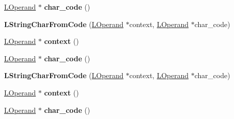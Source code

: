 \begin{DoxyCompactItemize}
\item 
\hyperlink{classv8_1_1internal_1_1_l_operand}{L\+Operand} $\ast$ {\bfseries char\+\_\+code} ()\hypertarget{classv8_1_1internal_1_1_l_string_char_from_code_a93cc7e1f404a16531d549201415f09e1}{}\label{classv8_1_1internal_1_1_l_string_char_from_code_a93cc7e1f404a16531d549201415f09e1}

\item 
{\bfseries L\+String\+Char\+From\+Code} (\hyperlink{classv8_1_1internal_1_1_l_operand}{L\+Operand} $\ast$context, \hyperlink{classv8_1_1internal_1_1_l_operand}{L\+Operand} $\ast$char\+\_\+code)\hypertarget{classv8_1_1internal_1_1_l_string_char_from_code_a0b0f2d230156e96656bb7d58558684a4}{}\label{classv8_1_1internal_1_1_l_string_char_from_code_a0b0f2d230156e96656bb7d58558684a4}

\item 
\hyperlink{classv8_1_1internal_1_1_l_operand}{L\+Operand} $\ast$ {\bfseries context} ()\hypertarget{classv8_1_1internal_1_1_l_string_char_from_code_a4356472324b4b7a5d7ffebc9b5db601a}{}\label{classv8_1_1internal_1_1_l_string_char_from_code_a4356472324b4b7a5d7ffebc9b5db601a}

\item 
\hyperlink{classv8_1_1internal_1_1_l_operand}{L\+Operand} $\ast$ {\bfseries char\+\_\+code} ()\hypertarget{classv8_1_1internal_1_1_l_string_char_from_code_a93cc7e1f404a16531d549201415f09e1}{}\label{classv8_1_1internal_1_1_l_string_char_from_code_a93cc7e1f404a16531d549201415f09e1}

\item 
{\bfseries L\+String\+Char\+From\+Code} (\hyperlink{classv8_1_1internal_1_1_l_operand}{L\+Operand} $\ast$context, \hyperlink{classv8_1_1internal_1_1_l_operand}{L\+Operand} $\ast$char\+\_\+code)\hypertarget{classv8_1_1internal_1_1_l_string_char_from_code_a0b0f2d230156e96656bb7d58558684a4}{}\label{classv8_1_1internal_1_1_l_string_char_from_code_a0b0f2d230156e96656bb7d58558684a4}

\item 
\hyperlink{classv8_1_1internal_1_1_l_operand}{L\+Operand} $\ast$ {\bfseries context} ()\hypertarget{classv8_1_1internal_1_1_l_string_char_from_code_a4356472324b4b7a5d7ffebc9b5db601a}{}\label{classv8_1_1internal_1_1_l_string_char_from_code_a4356472324b4b7a5d7ffebc9b5db601a}

\item 
\hyperlink{classv8_1_1internal_1_1_l_operand}{L\+Operand} $\ast$ {\bfseries char\+\_\+code} ()\hypertarget{classv8_1_1internal_1_1_l_string_char_from_code_a93cc7e1f404a16531d549201415f09e1}{}\label{classv8_1_1internal_1_1_l_string_char_from_code_a93cc7e1f404a16531d549201415f09e1}

\end{DoxyCompactItemize}
